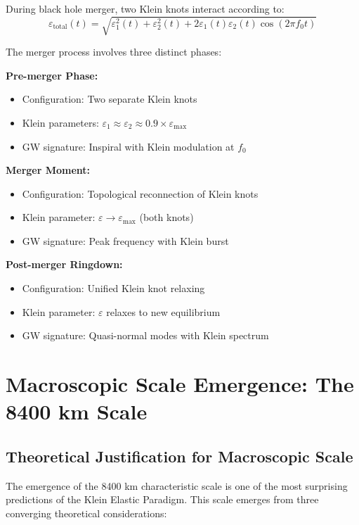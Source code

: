 \documentclass[12pt,a4paper]{article}
\newcommand{\epsilonmax}{\varepsilon_{\text{max}}}
\newcommand{\fzero}{f_0}
\begin{document}
During black hole merger, two Klein knots interact according to:
\begin{equation}
\varepsilon_{\text{total}}(t) = \sqrt{\varepsilon_1^2(t) + \varepsilon_2^2(t) + 2\varepsilon_1(t)\varepsilon_2(t)\cos(2\pi\fzero t)}
\end{equation}

The merger process involves three distinct phases:

\textbf{Pre-merger Phase:}
\begin{itemize}
    \item Configuration: Two separate Klein knots
    \item Klein parameters: $\varepsilon_1 \approx \varepsilon_2 \approx 0.9 \times \epsilonmax$
    \item GW signature: Inspiral with Klein modulation at $\fzero$
\end{itemize}

\textbf{Merger Moment:}
\begin{itemize}
    \item Configuration: Topological reconnection of Klein knots
    \item Klein parameter: $\varepsilon \rightarrow \epsilonmax$ (both knots)
    \item GW signature: Peak frequency with Klein burst
\end{itemize}

\textbf{Post-merger Ringdown:}
\begin{itemize}
    \item Configuration: Unified Klein knot relaxing
    \item Klein parameter: $\varepsilon$ relaxes to new equilibrium
    \item GW signature: Quasi-normal modes with Klein spectrum
\end{itemize}

\section{Macroscopic Scale Emergence: The 8400 km Scale}

\subsection{Theoretical Justification for Macroscopic Scale}

The emergence of the 8400 km characteristic scale is one of the most surprising predictions of the Klein Elastic Paradigm. This scale emerges from three converging theoretical considerations:
\end{document}
